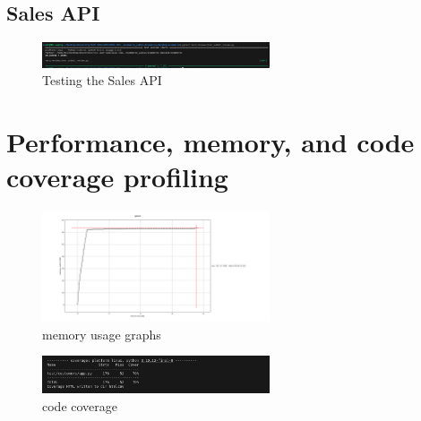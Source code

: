 \documentclass[a4paper,12pt]{article}
\begin{document}
\subsection{Sales API}
\begin{figure}[H]
  \centering
  \includegraphics[width=0.6\textwidth]{images/37.png}
  \caption{Testing the Sales API}
\end{figure}
\section{Performance, memory, and code coverage profiling}
\begin{figure}[H]
  \centering
  \includegraphics[width=0.6\textwidth]{images/38.png}
  \caption{memory usage graphs}
\end{figure}
\begin{figure}[H]
  \centering
  \includegraphics[width=0.6\textwidth]{images/39.png}
  \caption{code coverage}
\end{figure}
\end{document}
